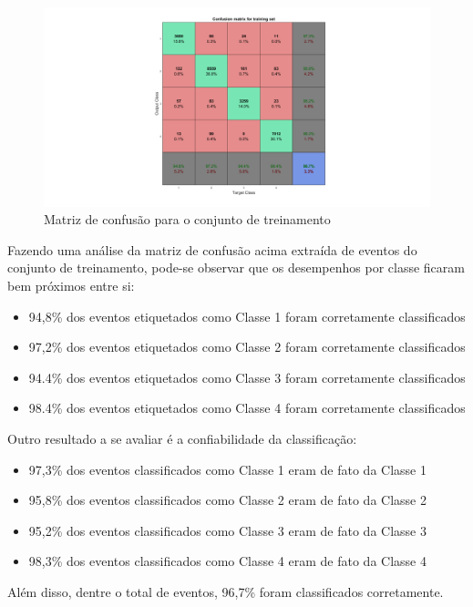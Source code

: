 \documentclass[]{report}
\begin{document}
	\begin{figure}[H]
		\vspace{-4cm}
		\hspace{-5cm}\includegraphics[width=1.8\linewidth]{picts/confusion_train.png}
		\vspace{-1.2cm}\caption{Matriz de confusão para o conjunto de treinamento}
		
		\vspace{0.8cm}
	\end{figure}
	Fazendo uma análise da matriz de confusão acima extraída de eventos do conjunto de treinamento, pode-se observar que os desempenhos por classe ficaram bem próximos entre si:
	\begin{itemize}
		\item 94,8\% dos eventos etiquetados como Classe 1 foram corretamente classificados
		\item 97,2\% dos eventos etiquetados como Classe 2 foram corretamente classificados
		\item 94.4\% dos eventos etiquetados como Classe 3 foram corretamente classificados
		\item 98.4\% dos eventos etiquetados como Classe 4 foram corretamente classificados
	\end{itemize}
	Outro resultado a se avaliar é a confiabilidade da classificação:
	\begin{itemize}
		\item 97,3\% dos eventos classificados como Classe 1 eram de fato da Classe 1
		\item 95,8\% dos eventos classificados como Classe 2 eram de fato da Classe 2
		\item 95,2\% dos eventos classificados como Classe 3 eram de fato da Classe 3
		\item 98,3\% dos eventos classificados como Classe 4 eram de fato da Classe 4
	\end{itemize}
	\vspace{0.5cm}
	Além disso, dentre o total de eventos, 96,7\% foram classificados corretamente.
\end{document}
